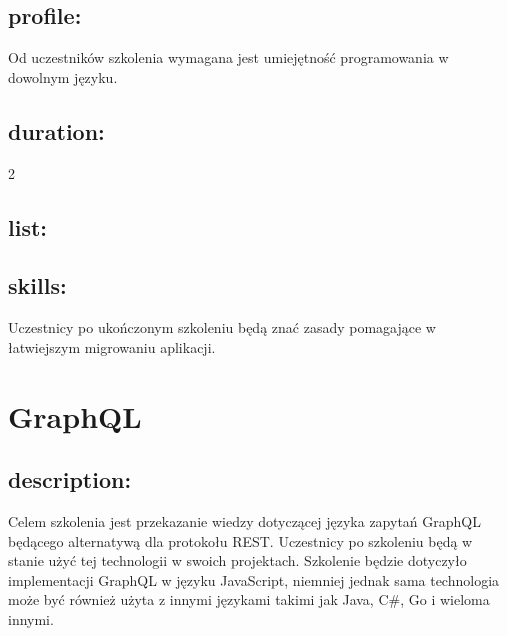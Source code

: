 \documentclass{article}[10pt]
\begin{document}
	\subsection*{profile:}
\begin{adjustwidth}{2cm}{}
	
Od uczestników szkolenia wymagana jest umiejętność programowania w dowolnym języku.

\end{adjustwidth}
	\subsection*{duration:}
\begin{adjustwidth}{2cm}{}
	2
\end{adjustwidth}

	\subsection*{list:}
\begin{adjustwidth}{1.5cm}{}
	\begin{itemize}










	\end{itemize}
\end{adjustwidth}

	\subsection*{skills:}
\begin{adjustwidth}{2cm}{}
	
Uczestnicy po ukończonym szkoleniu będą znać zasady pomagające w łatwiejszym migrowaniu aplikacji.

\end{adjustwidth}

\newpage


    
	\section{GraphQL}

	\subsection*{description:}
	\begin{adjustwidth}{2cm}{}
		
Celem szkolenia jest przekazanie wiedzy dotyczącej języka zapytań GraphQL będącego alternatywą dla protokołu REST. Uczestnicy po szkoleniu będą w stanie użyć tej technologii w swoich projektach. Szkolenie będzie dotyczyło implementacji GraphQL w języku JavaScript, niemniej jednak sama technologia może być również użyta z innymi językami takimi jak Java, C#, Go i wieloma innymi.
	\end{adjustwidth}
\end{document}
